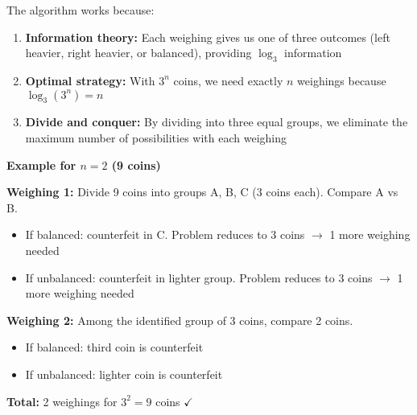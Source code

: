 \documentclass[12pt,a4paper]{article}
\theoremstyle{definition}
\theoremstyle{remark}
\begin{document}
The algorithm works because:

\begin{enumerate}
\item \textbf{Information theory:} Each weighing gives us one of three outcomes (left heavier, right heavier, or balanced), providing $\log_3$ information
\item \textbf{Optimal strategy:} With $3^n$ coins, we need exactly $n$ weighings because $\log_3(3^n) = n$
\item \textbf{Divide and conquer:} By dividing into three equal groups, we eliminate the maximum number of possibilities with each weighing
\end{enumerate}

\textbf{Example for $n = 2$ (9 coins)}

\textbf{Weighing 1:} Divide 9 coins into groups A, B, C (3 coins each). Compare A vs B.
\begin{itemize}
\item If balanced: counterfeit in C. Problem reduces to 3 coins $\rightarrow$ 1 more weighing needed
\item If unbalanced: counterfeit in lighter group. Problem reduces to 3 coins $\rightarrow$ 1 more weighing needed
\end{itemize}

\textbf{Weighing 2:} Among the identified group of 3 coins, compare 2 coins.
\begin{itemize}
\item If balanced: third coin is counterfeit
\item If unbalanced: lighter coin is counterfeit
\end{itemize}

\textbf{Total:} 2 weighings for $3^2 = 9$ coins $\checkmark$
\end{document}
